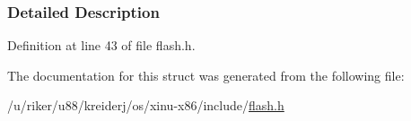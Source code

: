 \subsubsection{Detailed Description}


Definition at line 43 of file flash.\+h.



The documentation for this struct was generated from the following file\+:\begin{DoxyCompactItemize}
\item 
/u/riker/u88/kreiderj/os/xinu-\/x86/include/\hyperlink{flash_8h}{flash.\+h}\end{DoxyCompactItemize}
